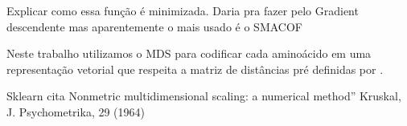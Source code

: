 {\color{red} Explicar como essa função é minimizada. Daria pra fazer pelo Gradient descendente mas aparentemente o mais usado é o SMACOF}

Neste trabalho utilizamos o MDS para codificar cada aminoácido em uma representação vetorial
que respeita a matriz de distâncias pré definidas por \cite{aminodist}. 

{\color{red} Sklearn cita Nonmetric multidimensional scaling: a numerical method” Kruskal, J. Psychometrika, 29 (1964)}














